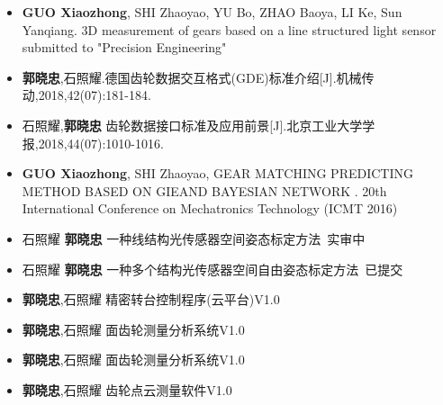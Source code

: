 %
%



\begin{itemize}
	\item \textbf{GUO Xiaozhong}, SHI Zhaoyao, YU Bo, ZHAO Baoya, LI Ke, Sun Yanqiang. 3D measurement of gears based on a line structured light sensor submitted to "Precision Engineering"\\
	 { \footnotesize {}} 
	\item \textbf{郭晓忠},石照耀.德国齿轮数据交互格式(GDE)标准介绍[J].机械传动,2018,42(07):181-184.\\
	 { \footnotesize {}}
	\item 石照耀,\textbf{郭晓忠} 齿轮数据接口标准及应用前景[J].北京工业大学学报,2018,44(07):1010-1016.	\\
	 { \footnotesize {}}
	 \item \textbf{GUO Xiaozhong}, SHI Zhaoyao, GEAR MATCHING PREDICTING METHOD BASED ON GIEAND BAYESIAN NETWORK .	20th International Conference on Mechatronics Technology (ICMT 2016)\\
	 { \footnotesize {}}
	\item 石照耀 \textbf{郭晓忠}  一种线结构光传感器空间姿态标定方法\ 实审中\\
	 { \footnotesize {}}
	 \item 石照耀 \textbf{郭晓忠}  一种多个结构光传感器空间自由姿态标定方法\ 已提交\\
	 { \footnotesize {}}
	\item \textbf{郭晓忠},石照耀  精密转台控制程序(云平台)V1.0 \\
	 { \footnotesize {}}
	 \item \textbf{郭晓忠},石照耀 面齿轮测量分析系统V1.0 \\
	 { \footnotesize {}}
	 \item \textbf{郭晓忠},石照耀  面齿轮测量分析系统V1.0 \\
	 { \footnotesize {}}
	 \item \textbf{郭晓忠},石照耀  齿轮点云测量软件V1.0 \\
	 { \footnotesize {}}
\end{itemize}